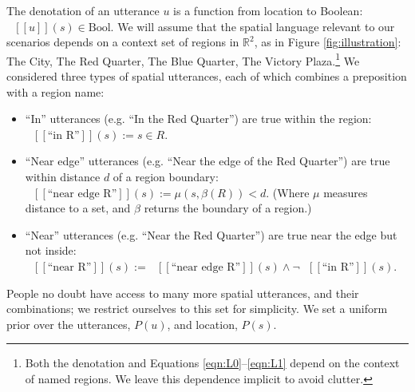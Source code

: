 \documentclass[10pt,letterpaper]{article}
\newcommand{\denote}[1]{\mbox{ $[\![ #1 ]\!]$}}
\begin{document}
The denotation of an utterance $u$ is a function from location to Boolean: $\denote{u}(s)\in \text{Bool}$.
We will assume that the spatial language relevant to our scenarios depends on a context set of regions in $\mathbb{R}^2$, as in Figure \ref{fig:illustration}: The City, The Red Quarter, The Blue Quarter, The Victory Plaza.\footnote{Both the denotation and Equations \ref{eqn:L0}--\ref{eqn:L1} depend on the context of named regions. We leave this dependence implicit to avoid clutter.}
We considered three types of spatial utterances, each of which combines a preposition with a region name: 
\begin{itemize}
\item ``In'' utterances (e.g. ``In the Red Quarter'') are true within the region: $\denote{\text{``in R''}}(s) := s\in R$.
\item ``Near edge'' utterances (e.g. ``Near the edge of the Red Quarter'') are true within distance $d$ of a region boundary: $\denote{\text{``near edge R''}}(s) := \mu(s,\beta(R))<d$. (Where $\mu$ measures distance to a set, and $\beta$ returns the boundary of a region.)
\item ``Near'' utterances (e.g. ``Near the Red Quarter'') are true near the edge but not inside: $\denote{\text{``near R''}}(s) := 
\denote{\text{``near edge R''}}(s) \wedge \neg \denote{\text{``in R''}}(s)$.
\end{itemize}
People no doubt have access to many more spatial utterances, and their combinations; we restrict ourselves to this set for simplicity. We set a uniform prior over the utterances, $P(u)$, and location, $P(s)$. 





\end{document}
